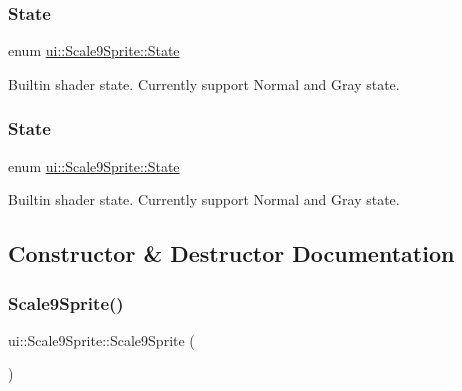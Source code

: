 \subsubsection{\texorpdfstring{State}{State}\hspace{0.1cm}{\footnotesize\ttfamily [1/2]}}
{\footnotesize\ttfamily enum \hyperlink{classui_1_1Scale9Sprite_a6580c2817c63b7a2461c48378b199d79}{ui\+::\+Scale9\+Sprite\+::\+State}\hspace{0.3cm}{\ttfamily [strong]}}

Builtin shader state. Currently support Normal and Gray state. \mbox{\label{classui_1_1Scale9Sprite_a6580c2817c63b7a2461c48378b199d79}} 
\subsubsection{\texorpdfstring{State}{State}\hspace{0.1cm}{\footnotesize\ttfamily [2/2]}}
{\footnotesize\ttfamily enum \hyperlink{classui_1_1Scale9Sprite_a6580c2817c63b7a2461c48378b199d79}{ui\+::\+Scale9\+Sprite\+::\+State}\hspace{0.3cm}{\ttfamily [strong]}}

Builtin shader state. Currently support Normal and Gray state. 

\subsection{Constructor \& Destructor Documentation}
\mbox{\label{classui_1_1Scale9Sprite_aec8b65903ec8cbb40857592d2b4c49a8}} 
\subsubsection{\texorpdfstring{Scale9\+Sprite()}{Scale9Sprite()}\hspace{0.1cm}{\footnotesize\ttfamily [1/2]}}
{\footnotesize\ttfamily ui\+::\+Scale9\+Sprite\+::\+Scale9\+Sprite (\begin{DoxyParamCaption}{ }\end{DoxyParamCaption})}

